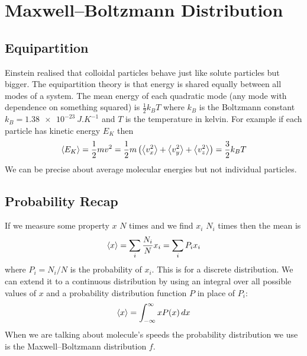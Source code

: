 \documentclass{article}
\begin{document}
    \section{Maxwell--Boltzmann Distribution}
    \subsection{Equipartition}
    Einstein realised that colloidal particles behave just like solute particles but bigger.
    The equipartition theory is that energy is shared equally between all modes of a system.
    The mean energy of each quadratic mode (any mode with dependence on something squared) is \(\frac{1}{2}k_BT\) where \(k_B\) is the Boltzmann constant \(k_B = \SI{1.38e-23}{J.K^{-1}}\) and \(T\) is the temperature in kelvin.
    For example if each particle has kinetic energy \(E_K\) then
    \[\left\langle{E_K}\right\rangle = \frac{1}{2}mv^2 = \frac{1}{2}m\left(\left\langle{v_x^2}\right\rangle + \left\langle{v_y^2}\right\rangle + \left\langle{v_z^2}\right\rangle\right) = \frac{3}{2}k_BT\]
    We can be precise about average molecular energies but not individual particles.
    
    \subsection{Probability Recap}
    If we measure some property \(x\) \(N\) times and we find \(x_i\) \(N_i\) times then the mean is
    \[\left\langle{x}\right\rangle = \sum_i\frac{N_i}{N}x_i = \sum_i P_ix_i\]
    where \(P_i = N_i/N\) is the probability of \(x_i\).
    This is for a discrete distribution.
    We can extend it to a continuous distribution by using an integral over all possible values of \(x\) and a probability distribution function \(P\) in place of \(P_i\):
    \[\left\langle{x}\right\rangle = \int_{-\infty}^{\infty}xP(x)\,dx\]
    When we are talking about molecule's speeds the probability distribution we use is the Maxwell--Boltzmann distribution \(f\).
    
\end{document}
